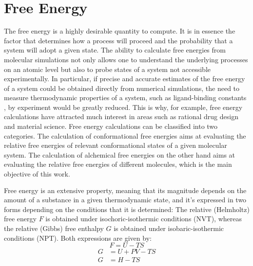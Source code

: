 \section{Free Energy}\label{sec:Free_energy}
\vspace{3cm}
\par


The free energy is a highly desirable quantity to compute. It is in essence the factor that determines how a process will proceed and the probability that a system will adopt a given state. The ability to calculate free energies from molecular simulations not only allows one to understand the underlying processes on an atomic level but also to probe states of a system not accessible experimentally. In particular, if precise and accurate estimates of the free energy of a system could be obtained directly from numerical simulations, the need to measure thermodynamic properties of a system, such as ligand-binding constants \cite{free_energy}, by experiment would be greatly reduced. This is why, for example, free energy calculations have attracted much interest in areas such as rational drug design and material science. 
Free energy calculations can be classiﬁed into two categories. The calculation of conformational free energies aims at evaluating the relative free energies of relevant conformational states of a given molecular system. The calculation of alchemical free energies on the other hand aims at evaluating the relative free energies of diﬀerent molecules, which is the main objective of this work. 

Free energy is an extensive property, meaning that its magnitude depends on the amount of a substance in a given thermodynamic state, and it's expressed in two forms depending on the conditions that it is determined: The relative (Helmholtz) free energy $F$ is obtained under isochoric-isothermic conditions (NVT), whereas the relative (Gibbs) free enthalpy $G$ is obtained under isobaric-isothermic conditions (NPT). Both expressions are given by: 
\begin{equation}
    F=U-TS
    \label{eq:Helmholtz}
\end{equation}
\begin{equation}
    \begin{split}
    G&=U+PV-TS\\ 
     G&=H-TS
    \end{split}
    \label{eq:Gibbs}
\end{equation}

